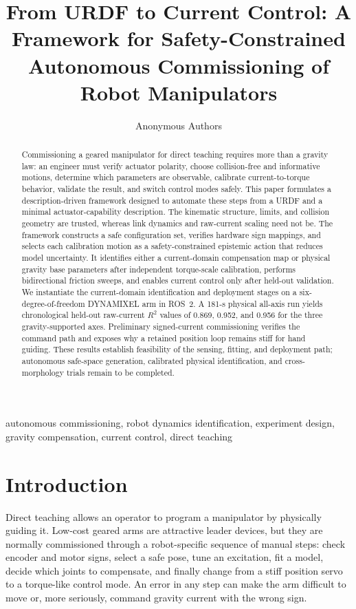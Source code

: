 \documentclass[conference]{IEEEtran}
\title{From URDF to Current Control: A Framework for Safety-Constrained Autonomous Commissioning of Robot Manipulators}
\author{Anonymous Authors}
\begin{document}
\maketitle

\begin{abstract}
Commissioning a geared manipulator for direct teaching requires more than a
gravity law: an engineer must verify actuator polarity, choose collision-free
and informative motions, determine which parameters are observable, calibrate
current-to-torque behavior, validate the result, and switch control modes
safely. This paper formulates a description-driven framework designed to automate
these steps from a URDF and a minimal actuator-capability description. The
kinematic structure, limits, and collision geometry are trusted, whereas link
dynamics and raw-current scaling need not be. The framework constructs a safe
configuration set, verifies hardware sign mappings, and selects each
calibration motion as a safety-constrained epistemic action that reduces model
uncertainty. It identifies either a current-domain compensation map or
physical gravity base parameters after independent torque-scale calibration,
performs bidirectional friction sweeps, and enables current control only after
held-out validation. We instantiate the current-domain identification and
deployment stages on a six-degree-of-freedom DYNAMIXEL arm in ROS~2. A 181-s
physical all-axis run yields chronological held-out raw-current $R^2$ values of
0.869, 0.952, and 0.956 for the three gravity-supported axes. Preliminary
signed-current commissioning verifies the command path and exposes why a
retained position loop remains stiff for hand guiding. These results establish
feasibility of the sensing, fitting, and deployment path; autonomous safe-space
generation, calibrated physical identification, and cross-morphology trials
remain to be completed.
\end{abstract}

\begin{IEEEkeywords}
autonomous commissioning, robot dynamics identification, experiment design,
gravity compensation, current control, direct teaching
\end{IEEEkeywords}

\section{Introduction}
Direct teaching allows an operator to program a manipulator by physically
guiding it. Low-cost geared arms are attractive leader devices, but they are
normally commissioned through a robot-specific sequence of manual steps:
check encoder and motor signs, select a safe pose, tune an excitation, fit a
model, decide which joints to compensate, and finally change from a stiff
position servo to a torque-like control mode. An error in any step can make the
arm difficult to move or, more seriously, command gravity current with the
wrong sign.
\end{document}
